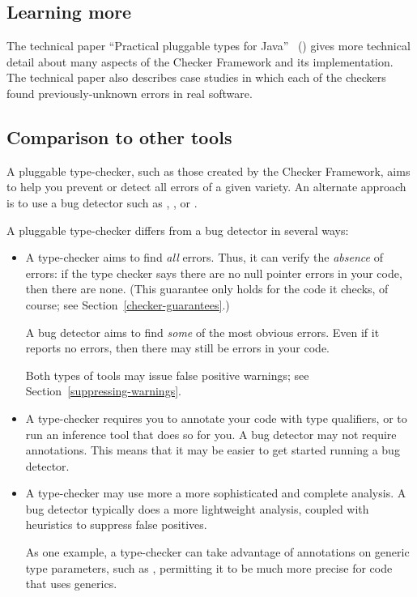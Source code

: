 \subsection{Learning more\label{learning-more}}

The technical paper ``Practical pluggable types for Java''~\cite{PapiACPE2008}
()
gives more technical detail about many
aspects of the Checker Framework and its implementation.
%
The technical
paper also describes case
studies in which each of the checkers found
previously-unknown errors in real software.


\subsection{Comparison to other tools\label{other-tools}}

A pluggable type-checker, such as those created by the Checker Framework,
aims to help you prevent or detect all errors of a given variety.  An
alternate approach is to use a bug detector such as
,
, or
.

A pluggable type-checker
differs from a bug detector in several ways:
\begin{itemize}
\item
  A type-checker aims to find \emph{all} errors.  Thus, it can verify the
  \emph{absence} of errors:  if the type checker says there are no null
  pointer errors in your code, then there are none.  (This guarantee only
  holds for the code it checks, of course; see
  Section~\ref{checker-guarantees}.)

  A bug detector aims to find \emph{some} of the most obvious errors.  Even
  if it reports no errors, then there may still be errors in your code.

  Both types of tools may issue false positive warnings; see
  Section~\ref{suppressing-warnings}.

\item
  A type-checker requires you to annotate your code with type qualifiers,
  or to run an inference tool that does so for you.  A bug detector may not
  require annotations.  This means that it may be easier to get started
  running a bug detector.

\item
  A type-checker may use more a more sophisticated and complete analysis.
  A bug detector typically does a more lightweight analysis, coupled with
  heuristics to suppress false positives.

  As one example, a type-checker can take advantage of annotations on
  generic type parameters, such as , permitting
  it to be much more precise for code that uses generics.

\end{itemize}

